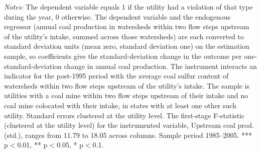 \begin{table}[htbp]
\begin{minipage}{\linewidth}
\vspace{4pt}
\footnotesize
\raggedright
\textit{Notes:} The dependent variable equals 1 if the utility had a violation of that type during the year, 0 otherwise. The dependent variable and the endogenous regressor (annual coal production in watersheds within two flow steps upstream of the utility's intake, summed across those watersheds) are each converted to standard deviation units (mean zero, standard deviation one) on the estimation sample, so coefficients give the standard-deviation change in the outcome per one-standard-deviation change in annual coal production. The instrument interacts an indicator for the post-1995 period with the average coal sulfur content of watersheds within two flow steps upstream of the utility's intake. The sample is utilities with a coal mine within two flow steps upstream of their intake and no coal mine colocated with their intake, in states with at least one other such utility. Standard errors clustered at the utility level. The first-stage F-statistic (clustered at the utility level) for the instrumented variable, Upstream coal prod. (std.), ranges from 11.79 to 18.05 across columns. Sample period 1985--2005. *** p$<$0.01, ** p$<$0.05, * p$<$0.1.
\end{minipage}
\end{table}
